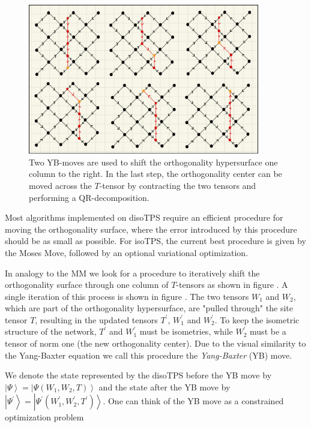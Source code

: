 \begin{figure}
	\centering
	\includegraphics[width=0.9\textwidth]{figures/Tensor_Networks/disoTPS_moving_ortho_surface.jpeg}
	\caption{Two YB-moves are used to shift the orthogonality hypersurface one column to the right. In the last step, the orthogonality center can be moved across the $T$-tensor by contracting the two tensors and performing a QR-decomposition.}
	\label{fig:disoTPS_moving_ortho_surface}
\end{figure}
Most algorithms implemented on disoTPS require an efficient procedure for moving the orthogonality surface, where the error introduced by this procedure should be as small as possible. For isoTPS, the current best procedure is given by the Moses Move, followed by an optional variational optimization. \par
In analogy to the MM we look for a procedure to iteratively shift the orthogonality surface through one column of $T$-tensors as shown in figure . A single iteration of this process is shown in figure . The two tensors $W_1$ and $W_2$, which are part of the orthogonality hypersurface, are "pulled through" the site tensor $T$, resulting in the updated tensors $T^\prime$, $W_1^\prime$ and $W_2^\prime$. To keep the isometric structure of the network, $T^\prime$ and $W_1^\prime$ must be isometries, while $W_2^\prime$ must be a tensor of norm one (the new orthogonality center). Due to the visual similarity to the Yang-Baxter equation we call this procedure the \textit{Yang-Baxter} (YB) move. \par
We denote the state represented by the disoTPS before the YB move by $\left|\Psi\right\rangle = \left|\Psi\left(W_1, W_2, T\right)\right\rangle$ and the state after the YB move by $\left|\Psi^\prime\right\rangle = \left|\Psi^\prime\left(W_1^\prime, W_2^\prime, T^\prime\right)\right\rangle$. One can think of the YB move as a constrained optimization problem
